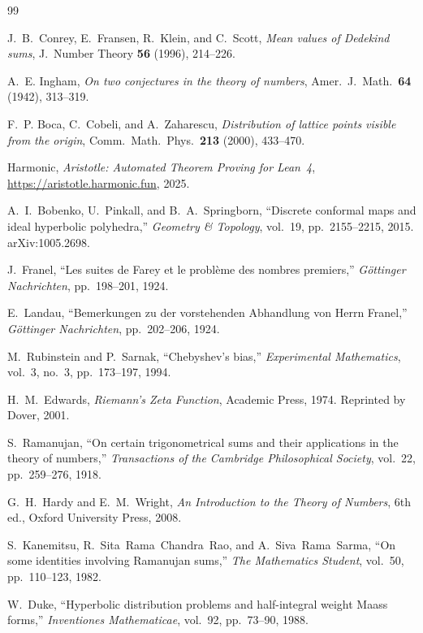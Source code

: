 \documentclass[11pt]{article}
\theoremstyle{definition}
\begin{document}
\FloatBarrier
\begin{thebibliography}{99}

J.~B.~Conrey, E.~Fransen, R.~Klein, and C.~Scott,
\emph{Mean values of Dedekind sums},
J.\ Number Theory \textbf{56} (1996), 214--226.


A.~E. Ingham,
\emph{On two conjectures in the theory of numbers},
Amer.\ J.\ Math.\ \textbf{64} (1942), 313--319.

F.~P. Boca, C.~Cobeli, and A.~Zaharescu,
\emph{Distribution of lattice points visible from the origin},
Comm.\ Math.\ Phys.\ \textbf{213} (2000), 433--470.

Harmonic,
\emph{Aristotle: Automated Theorem Proving for Lean~4},
\url{https://aristotle.harmonic.fun}, 2025.

A.~I.~Bobenko, U.~Pinkall, and B.~A.~Springborn,
``Discrete conformal maps and ideal hyperbolic polyhedra,''
\emph{Geometry \& Topology}, vol.~19, pp.~2155--2215, 2015.
arXiv:1005.2698.

J.~Franel,
``Les suites de Farey et le probl\`eme des nombres premiers,''
\emph{G\"ottinger Nachrichten}, pp.~198--201, 1924.

E.~Landau,
``Bemerkungen zu der vorstehenden Abhandlung von Herrn Franel,''
\emph{G\"ottinger Nachrichten}, pp.~202--206, 1924.

M.~Rubinstein and P.~Sarnak,
``Chebyshev's bias,''
\emph{Experimental Mathematics}, vol.~3, no.~3, pp.~173--197, 1994.


H.~M.~Edwards,
\emph{Riemann's Zeta Function},
Academic Press, 1974.
Reprinted by Dover, 2001.

S.~Ramanujan,
``On certain trigonometrical sums and their applications in the
theory of numbers,''
\emph{Transactions of the Cambridge Philosophical Society},
vol.~22, pp.~259--276, 1918.

G.~H.~Hardy and E.~M.~Wright,
\emph{An Introduction to the Theory of Numbers}, 6th ed.,
Oxford University Press, 2008.

S.~Kanemitsu, R.~Sita~Rama~Chandra~Rao, and A.~Siva~Rama~Sarma,
``On some identities involving Ramanujan sums,''
\emph{The Mathematics Student}, vol.~50, pp.~110--123, 1982.

W.~Duke,
``Hyperbolic distribution problems and half-integral weight Maass forms,''
\emph{Inventiones Mathematicae}, vol.~92, pp.~73--90, 1988.


\end{thebibliography}
\end{document}
